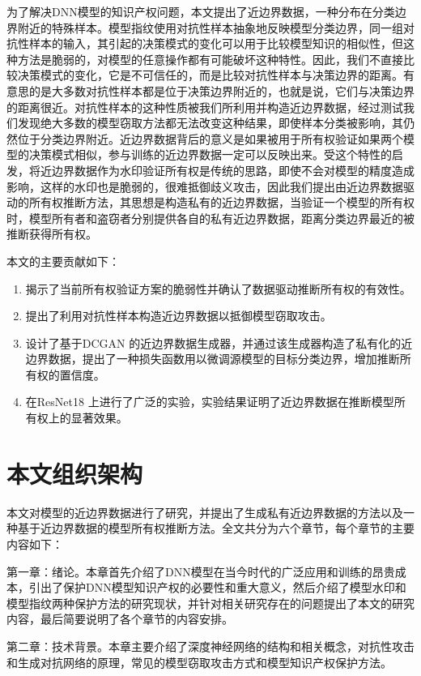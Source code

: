 为了解决DNN模型的知识产权问题，本文提出了近边界数据，一种分布在分类边界附近的特殊样本。模型指纹\cite{cao2021ipguard}使用对抗性样本抽象地反映模型分类边界，同一组对抗性样本的输入，其引起的决策模式的变化可以用于比较模型知识的相似性，但这种方法是脆弱的，对模型的任意操作都有可能破坏这种特性。因此，我们不直接比较决策模式的变化，它是不可信任的，而是比较对抗性样本与决策边界的距离。有意思的是大多数对抗性样本都是位于决策边界附近的，也就是说，它们与决策边界的距离很近。对抗性样本的这种性质被我们所利用并构造近边界数据，经过测试我们发现绝大多数的模型窃取方法都无法改变这种结果，即使样本分类被影响，其仍然位于分类边界附近。近边界数据背后的意义是如果被用于所有权验证如果两个模型的决策模式相似，参与训练的近边界数据一定可以反映出来。受这个特性的启发，将近边界数据作为水印验证所有权是传统的思路，即使不会对模型的精度造成影响，这样的水印也是脆弱的，很难抵御歧义攻击，因此我们提出由近边界数据驱动的所有权推断方法，其思想是构造私有的近边界数据，当验证一个模型的所有权时，模型所有者和盗窃者分别提供各自的私有近边界数据，距离分类边界最近的被推断获得所有权。

本文的主要贡献如下：

\begin{enumerate}
	\renewcommand{\labelenumi}{\theenumi)}
	\item 揭示了当前所有权验证方案的脆弱性并确认了数据驱动推断所有权的有效性。
	\item 提出了利用对抗性样本构造近边界数据以抵御模型窃取攻击。
	\item 设计了基于DCGAN 的近边界数据生成器，并通过该生成器构造了私有化的近边界数据，提出了一种损失函数用以微调源模型的目标分类边界，增加推断所有权的置信度。
	\item 在ResNet18 上进行了广泛的实验，实验结果证明了近边界数据在推断模型所有权上的显著效果。
\end{enumerate}

\section{本文组织架构}

本文对模型的近边界数据进行了研究，并提出了生成私有近边界数据的方法以及一种基于近边界数据的模型所有权推断方法。全文共分为六个章节，每个章节的主要内容如下：

第一章：绪论。本章首先介绍了DNN模型在当今时代的广泛应用和训练的昂贵成本，引出了保护DNN模型知识产权的必要性和重大意义，然后介绍了模型水印和模型指纹两种保护方法的研究现状，并针对相关研究存在的问题提出了本文的研究内容，最后简要说明了各个章节的内容安排。

第二章：技术背景。本章主要介绍了深度神经网络的结构和相关概念，对抗性攻击和生成对抗网络的原理，常见的模型窃取攻击方式和模型知识产权保护方法。

